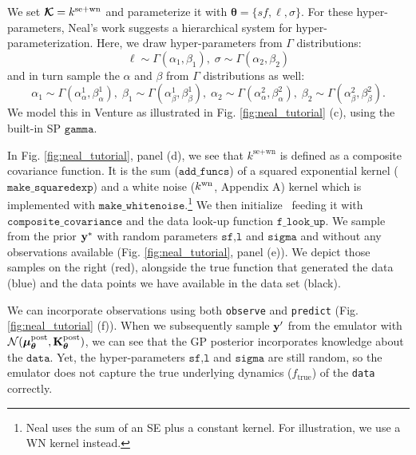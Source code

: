 We set $\bm{\mathcal{K}} = k^{\text{se}+\text{wn}}$ and parameterize it with $\bm{\theta}=\{sf,\ell,\sigma\}$.
For these hyper-parameters, Neal's work suggests a hierarchical system for
hyper-parameterization.
Here, we draw hyper-parameters from $\Gamma$ distributions:
\begin{equation}
\label{eq:hyper-ell}
\ell \sim \Gamma(\alpha_1,\beta_1),\;\sigma \sim \Gamma(\alpha_2,\beta_2)
\end{equation} 
and in turn sample the $\alpha$ and $\beta$ from $\Gamma$ distributions as well:
\begin{equation}
\label{eq:hyper-alpha}
\alpha_1 \sim \Gamma(\alpha^1_{\alpha},\beta^1_{ \alpha } ),\;
\beta_1 \sim \Gamma(\alpha^1_{\beta},\beta^1_{ \beta } ),\;
\alpha_2 \sim \Gamma(\alpha^2_{\alpha},\beta^2_{\alpha}),\;
\beta_2 \sim \Gamma(\alpha^2_{\beta},\beta^2_{\beta}).
\end{equation}
We model this in Venture as illustrated in Fig. \ref{fig:neal_tutorial} (c),
using the built-in \ac{SP} $\texttt{gamma}$. 

In Fig. \ref{fig:neal_tutorial}, panel (d), we see that $k^{\text{se}+\text{wn}}$
is defined as a composite covariance function. It is the sum ($\texttt{add\_funcs}$) of
a squared exponential kernel ($\texttt{make\_squaredexp}$) and a white noise
($k^\text{wn}$, Appendix A)
kernel which is implemented with $\texttt{make\_whitenoise}$.\footnote{
Neal \citeyearpar{neal1997monte} uses the sum of an SE
plus a constant kernel. For illustration, we use a WN kernel
instead.}
We then initialize \gpmem\ feeding it with $\texttt{composite\_covariance}$ and the data
look-up function $\texttt{f\_look\_up}$. 
We sample from the prior $\mathbf{y}^*$ with random parameters $\texttt{sf,l}$ and $\texttt{sigma}$ and 
without any observations available (Fig. \ref{fig:neal_tutorial}, panel (e)).
We depict those samples on the right (red), alongside the true function that generated the data (blue) and
the data points we have available in the data set (black).

We can incorporate observations using both \texttt{observe} and \texttt{predict} (Fig. \ref{fig:neal_tutorial} (f)).
When we subsequently sample $\mathbf{y}^\prime$ from the emulator with
$\mathcal{N}(\bm{\mu}_{\bm{\theta}}^\text{post},\mathbf{K}_{\bm{\theta}}^\text{post})$, we can see that the \ac{GP} posterior incorporates knowledge 
about the $\texttt{data}$. Yet, the hyper-parameters $\texttt{sf,l}$ and $\texttt{sigma}$ are still
random, so the emulator does not capture the true underlying dynamics
($f_\text{true}$) of the \texttt{data} correctly. 

